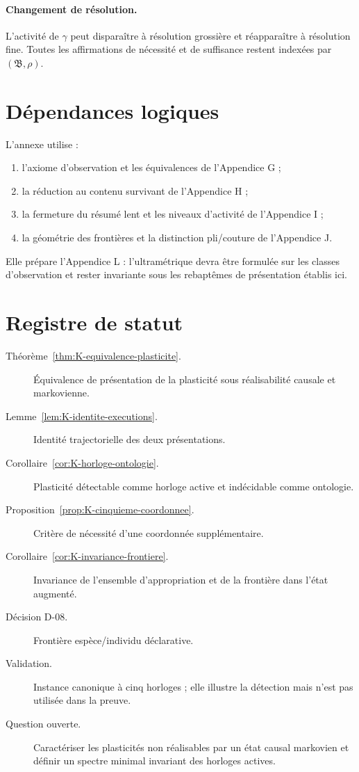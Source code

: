 \paragraph{Changement de résolution.}
L'activité de $\gamma$ peut disparaître à résolution grossière et
réapparaître à résolution fine. Toutes les affirmations de nécessité et
de suffisance restent indexées par $(\mathfrak B,\rho)$.

\section{Dépendances logiques}
\label{annexe-K-dependances}

L'annexe utilise :
\begin{enumerate}
\item l'axiome d'observation et les équivalences de l'Appendice G ;
\item la réduction au contenu survivant de l'Appendice H ;
\item la fermeture du résumé lent et les niveaux d'activité de
l'Appendice I ;
\item la géométrie des frontières et la distinction pli/couture de
l'Appendice J.
\end{enumerate}
Elle prépare l'Appendice L : l'ultramétrique devra être formulée sur les
classes d'observation et rester invariante sous les rebaptêmes de
présentation établis ici.

\section{Registre de statut}
\label{annexe-K-registre}

\begin{description}
\item[Théorème~\ref{thm:K-equivalence-plasticite}.] Équivalence de présentation de la plasticité sous
réalisabilité causale et markovienne.
\item[Lemme~\ref{lem:K-identite-executions}.] Identité trajectorielle des deux présentations.
\item[Corollaire~\ref{cor:K-horloge-ontologie}.] Plasticité détectable comme horloge active et
indécidable comme ontologie.
\item[Proposition~\ref{prop:K-cinquieme-coordonnee}.] Critère de nécessité d'une coordonnée
supplémentaire.
\item[Corollaire~\ref{cor:K-invariance-frontiere}.] Invariance de l'ensemble d'appropriation et de la
frontière dans l'état augmenté.
\item[Décision D-08.] Frontière espèce/individu déclarative.
\item[Validation.] Instance canonique à cinq horloges ; elle illustre la
détection mais n'est pas utilisée dans la preuve.
\item[Question ouverte.] Caractériser les plasticités non réalisables par
un état causal markovien et définir un spectre minimal invariant des
horloges actives.
\end{description}

